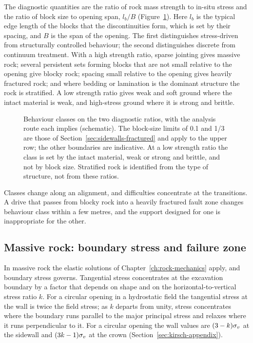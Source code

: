 The diagnostic quantities are the ratio of rock mass strength to in-situ stress
and the ratio of block size to opening span, $l_b/B$
(Figure~\ref{fig:behaviour-class-map}). Here $l_b$ is the typical edge length
of the blocks that the discontinuities form, which is set by their spacing,
and $B$ is the span of the opening. The first
distinguishes stress-driven from structurally controlled behaviour; the second
distinguishes discrete from continuum treatment. With a high strength ratio,
sparse jointing gives massive rock; several persistent sets forming blocks
that are not small relative to the opening give blocky rock; spacing small
relative to the opening gives heavily fractured rock; and where bedding or
lamination is the dominant structure the rock is stratified. A low strength
ratio gives weak and soft ground where the intact material is weak, and
high-stress ground where it is strong and brittle.

\begin{figure}[htbp]
\centering
{}
\caption{Behaviour classes on the two diagnostic ratios, with the analysis route each implies (schematic). The block-size limits of 0.1 and 1/3 are those of Section~\ref{sec:sidewalls-fractured} and apply to the upper row; the other boundaries are indicative. At a low strength ratio the class is set by the intact material, weak or strong and brittle, and not by block size. Stratified rock is identified from the type of structure, not from these ratios.}
\label{fig:behaviour-class-map}
\end{figure}

Classes change along an alignment, and difficulties concentrate at the
transitions. A drive that passes from blocky rock into a heavily fractured
fault zone changes behaviour class within a few metres, and the support
designed for one is inappropriate for the other.

\subsection{Massive rock: boundary stress and failure zone}
\label{sec:massive-rock}

In massive rock the elastic solutions of Chapter~\ref{ch:rock-mechanics}
apply, and boundary stress governs. Tangential stress concentrates at the
excavation boundary by a factor that depends on shape and on the
horizontal-to-vertical stress ratio $k$. For a circular opening in a
hydrostatic field the tangential stress at the wall is twice the field stress;
as $k$ departs from unity, stress concentrates where the boundary runs
parallel to the major principal stress and relaxes where it runs
perpendicular to it. For a circular opening the wall values are
$(3-k)\sigma_v$ at the sidewall and $(3k-1)\sigma_v$ at the crown
(Section~\ref{sec:kirsch-appendix}).

